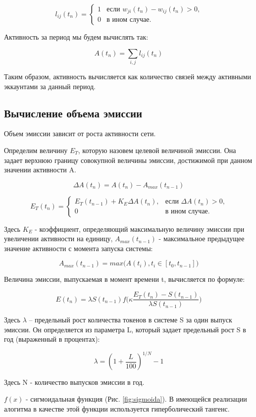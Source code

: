 \documentclass[a4paper,12pt]{article}
\begin{document}
$$
l_{ij}(t_n) = \begin{cases}
 1
 & \text{если $w_{ji}(t_n)-w_{ij}(t_n) > 0$,}\\
 0 & \text{в ином случае.}
\end{cases}
$$

Активность за период мы будем вычислять так:

$$
A(t_n) = \sum_{i,j} l_{ij}(t_n)
$$

Таким образом, активность вычисляется как количество связей между активными эккаунтами за данный период.

\subsection{Вычисление объема эмиссии}

Объем эмиссии зависит от роста активности сети.

Определим величину $E_T$, которую назовем целевой величиной эмиссии. Она задает верхнюю границу совокупной величины эмиссии, достижимой при данном значении активности A.

$$
\Delta A(t_n) = A(t_n) - A_{max}(t_{n-1})
$$

$$
E_T(t_n) = \begin{cases}
 E_T(t_{n-1}) + K_E \Delta A(t_n),
 & \text{если $\Delta A(t_n) > 0$,}\\
 0 & \text{в ином случае.}
\end{cases}
$$

Здесь $K_E$ - коэффициент, определяющий максимальную величину эмиссии при увеличении активности на единицу, $A_{max}(t_{n-1})$ - максимальное предыдущее значение активности с момента запуска системы:

$$
    A_{max}(t_{n-1}) = max \Big ( A(t_i), t_i \in [t_0, t_{n-1}] \Big )
$$

Величина эмиссии, выпускаемая в момент времени t, вычисляется по формуле:

$$
    E(t_n) = \lambda S(t_{n-1}) f \Big( \kappa \frac {E_T(t_n) - S(t_{n-1})}{\lambda S(t_{n-1})} \Big)
$$

Здесь $\lambda$ -- предельный рост количества токенов в системе S за один выпуск эмиссии. Он определяется из параметра L, который задает предельный рост S в год (выраженный в процентах):

$$
    \lambda = (1 + \frac{L}{100})^{1/N}-1
$$

Здесь N - количество выпусков эмиссии в год.

$f(x)$ - сигмоидальная функция (Рис. \ref{fig:sigmoida}). В имеющейся реализации алогитма в качестве этой функции используется гиперболический тангенс.
\end{document}
